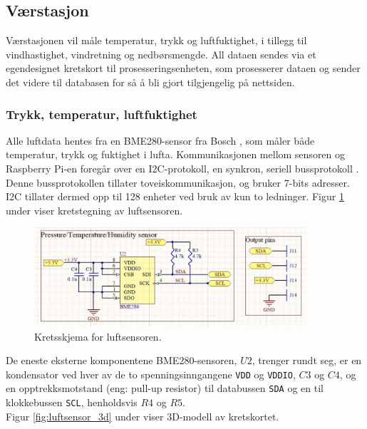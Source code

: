\subsection{Værstasjon}\label{sec:impl:vaer}

Værstasjonen vil måle temperatur, trykk og luftfuktighet, i tillegg til vindhastighet, vindretning og nedbørsmengde. 
All dataen sendes via et egendesignet kretskort til prosesseringsenheten, som prosesserer dataen og sender det videre til databasen for så å bli gjort tilgjengelig på nettsiden.


\subsubsection{Trykk, temperatur, luftfuktighet}\label{sec:impl:vaer:ttl}

Alle luftdata hentes fra en BME280-sensor fra Bosch \cite{bme280}, som måler både temperatur, trykk og fuktighet i lufta. 
Kommunikasjonen mellom sensoren og Raspberry Pi-en foregår over en I2C-protokoll, en synkron, seriell bussprotokoll \cite{i2c}. 
Denne bussprotokollen tillater toveiskommunikasjon, og bruker 7-bits adresser. 
I2C tillater dermed opp til 128 enheter ved bruk av kun to ledninger. 
Figur \ref{fig:luftsensor_krets-} under viser kretstegning av luftsensoren.

\begin{figure}[H]
    \centering
    \includegraphics[width=0.9\textwidth]{implementering/vaer/luftsensor_krets.png}
    \caption{Kretsskjema for luftsensoren.}
    \label{fig:luftsensor_krets-}
\end{figure}

De eneste eksterne komponentene BME280-sensoren, $U2$, trenger rundt seg, er en kondensator ved hver av de to spenningsinngangene \texttt{VDD} og \texttt{VDDIO}, $C3$ og $C4$, og en opptrekksmotstand (eng: pull-up resistor) til databussen \texttt{SDA} og en til klokkebussen \texttt{SCL}, henholdsvis $R4$ og $R5$. \\
Figur \ref{fig:luftsensor_3d} under viser 3D-modell av kretskortet.

